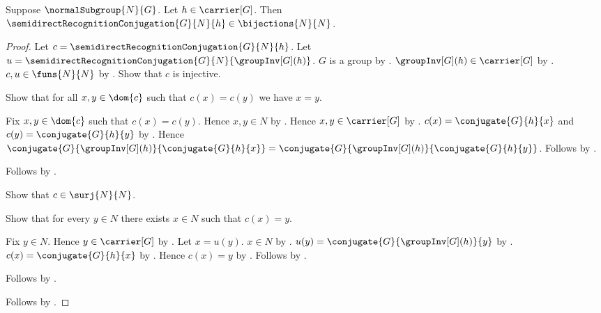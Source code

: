 \begin{theorem}\label{semidirect_recognition_conjugation_bijection}
    Suppose $\normalSubgroup{N}{G}$.
    Let $h\in\carrier[G]$.
    Then $\semidirectRecognitionConjugation{G}{N}{h}\in\bijections{N}{N}$.
\end{theorem}
\begin{proof}
    Let $c=\semidirectRecognitionConjugation{G}{N}{h}$.
    Let $u=\semidirectRecognitionConjugation
        {G}{N}{\groupInv[G](h)}$.
    $G$ is a group by .
    $\groupInv[G](h)\in\carrier[G]$ by
        .
    $c,u\in\funs{N}{N}$ by
        .
    Show that $c$ is injective.
    \begin{subproof}
        Show that for all $x,y\in\dom{c}$ such that $c(x)=c(y)$ we have
            $x=y$.
        \begin{subproof}
            Fix $x,y\in\dom{c}$ such that $c(x)=c(y)$.
            Hence $x,y\in N$ by .
            Hence $x,y\in\carrier[G]$ by
                .
            $c(x)=\conjugate{G}{h}{x}$ and
                $c(y)=\conjugate{G}{h}{y}$ by
                .
            Hence
                $\conjugate{G}{\groupInv[G](h)}{\conjugate{G}{h}{x}}=
                    \conjugate{G}{\groupInv[G](h)}
                        {\conjugate{G}{h}{y}}$.
            Follows by .
        \end{subproof}
        Follows by .
    \end{subproof}
    Show that $c\in\surj{N}{N}$.
    \begin{subproof}
        Show that for every $y\in N$ there exists $x\in N$ such that
            $c(x)=y$.
        \begin{subproof}
            Fix $y\in N$.
            Hence $y\in\carrier[G]$ by
                .
            Let $x=u(y)$.
            $x\in N$ by .
            $u(y)=\conjugate{G}{\groupInv[G](h)}{y}$ by
                .
            $c(x)=\conjugate{G}{h}{x}$ by
                .
            Hence $c(x)=y$ by
                .
            Follows by \auto.
        \end{subproof}
        Follows by .
    \end{subproof}
    Follows by .
\end{proof}

